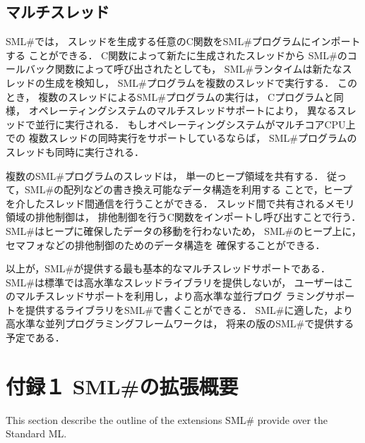 \documentclass{jbook}
\newif\ifjp
\newcommand{\txt}[2]{#1}
\newcommand{\smlsharp}{SML\#}
\begin{document}
\section{マルチスレッド}

	\smlsharp{}では，
スレッドを生成する任意のC関数を\smlsharp{}プログラムにインポートする
ことができる．
	C関数によって新たに生成されたスレッドから
\smlsharp{}のコールバック関数によって呼び出されたとしても，
\smlsharp{}ランタイムは新たなスレッドの生成を検知し，
\smlsharp{}プログラムを複数のスレッドで実行する．
	このとき，
複数のスレッドによる\smlsharp{}プログラムの実行は，
Cプログラムと同様，
オペレーティングシステムのマルチスレッドサポートにより，
異なるスレッドで並行に実行される．
	もしオペレーティングシステムがマルチコアCPU上での
複数スレッドの同時実行をサポートしているならば，
\smlsharp{}プログラムのスレッドも同時に実行される．

	複数の\smlsharp{}プログラムのスレッドは，
単一のヒープ領域を共有する．
	従って，\smlsharp{}の配列などの書き換え可能なデータ構造を利用する
ことで，ヒープを介したスレッド間通信を行うことができる．
	スレッド間で共有されるメモリ領域の排他制御は，
排他制御を行うC関数をインポートし呼び出すことで行う．
	\smlsharp{}はヒープに確保したデータの移動を行わないため，
\smlsharp{}のヒープ上に，セマフォなどの排他制御のためのデータ構造を
確保することができる．

	以上が，\smlsharp{}が提供する最も基本的なマルチスレッドサポートである．
	\smlsharp{}は標準では高水準なスレッドライブラリを提供しないが，
ユーザーはこのマルチスレッドサポートを利用し，より高水準な並行プログ
ラミングサポートを提供するライブラリを\smlsharp{}で書くことができる．
	\smlsharp{}に適した，より高水準な並列プログラミングフレームワークは，
将来の版の\smlsharp{}で提供する予定である．

% 
\ifjp%
\else%
\fi%

\chapter{\txt{付録１ \smlsharp{}の拡張概要}{Appendix 1 The Summary of \smlsharp{} Extensions}}
\ifjp%
	本節では，Standard MLに習熟した読者のために，\smlsharp{}が提供す
る拡張の概要を記述する．
\else%
	This section describe the outline of the extensions \smlsharp{}
provide over the Standard ML.
\fi%
\end{document}

